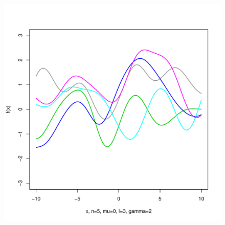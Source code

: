 \documentclass[12pt,letterpaper]{article}
\begin{document}
\begin{figure}
\begin{center}
\includegraphics[scale=0.2]{hw321/n5-m0-l3-g4.pdf}
\end{center}
\end{figure}
\end{document}

